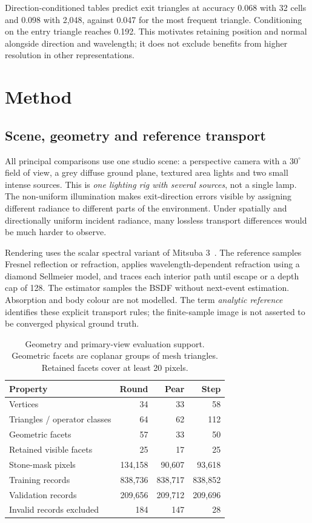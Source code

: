 \documentclass[conference]{IEEEtran}
\newcommand{\dg}{^{\circ}}
\begin{document}
Direction-conditioned tables predict exit triangles at accuracy 0.068 with
32 cells and 0.098 with 2,048, against 0.047 for the most frequent triangle.
Conditioning on the entry triangle reaches 0.192. This motivates retaining
position and normal alongside direction and wavelength; it does not exclude
benefits from higher resolution in other representations.

\section{Method}
\label{sec:method}
\subsection{Scene, geometry and reference transport}
All principal comparisons use one studio scene: a perspective camera with a
$30\dg$ field of view, a grey diffuse ground plane, textured area lights and
two small intense sources. This is \emph{one lighting rig with several sources},
not a single lamp. The non-uniform illumination makes exit-direction errors
visible by assigning different radiance to different parts of the environment.
Under spatially and directionally uniform incident radiance, many lossless
transport differences would be much harder to observe.

Rendering uses the scalar spectral variant of Mitsuba
3~\cite{mitsuba3}. The reference samples Fresnel reflection or refraction,
applies wavelength-dependent refraction using a diamond Sellmeier model, and
traces each interior path until escape or a depth cap of 128. The estimator
samples the BSDF without next-event estimation. Absorption and body colour are
not modelled. The term \emph{analytic reference} identifies these explicit
transport rules; the finite-sample image is not asserted to be converged
physical ground truth.

\begin{table}[t]
\caption{Geometry and primary-view evaluation support. Geometric facets are
coplanar groups of mesh triangles. Retained facets cover at least 20 pixels.}
\label{tab:geometry}
\centering\small
\begin{tabular}{@{}lrrr@{}}
\toprule
Property & Round & Pear & Step \\
\midrule
Vertices & 34 & 33 & 58 \\
Triangles / operator classes & 64 & 62 & 112 \\
Geometric facets & 57 & 33 & 50 \\
Retained visible facets & 25 & 17 & 25 \\
Stone-mask pixels & 134,158 & 90,607 & 93,618 \\
Training records & 838,736 & 838,717 & 838,852 \\
Validation records & 209,656 & 209,712 & 209,696 \\
Invalid records excluded & 184 & 147 & 28 \\
\bottomrule
\end{tabular}
\end{table}
\end{document}
